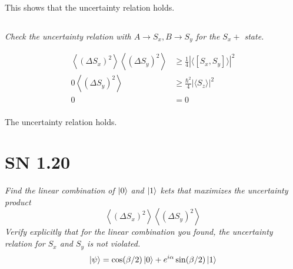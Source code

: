 \documentclass{article}
\begin{document}
This shows that the uncertainty relation holds. 

\subsection{}
\textit{Check the uncertainty relation with $A \rightarrow S_{x}, B \rightarrow S_{y}$ for the $S_{x}+$ state.}

\begin{align*}
\left\langle(\Delta  S_{x})^{2}\right\rangle\left\langle(\Delta  S_{y})^{2}\right\rangle &\geq \frac{1}{4}|\langle[ S_{x},  S_{y}]\rangle|^{2}\\
0 \left\langle(\Delta  S_{y})^{2}\right\rangle &\geq \frac{\hbar^2}{4} |\langle S_{z}\rangle|^{2}\\
0 &= 0 \\
\end{align*}

The uncertainty relation holds. 



\newpage
\section{SN 1.20}
\textit{Find the linear combination of $\ket{0}$ and $\ket{1}$ kets that maximizes the uncertainty product
$$
\left\langle\left(\Delta S_{x}\right)^{2}\right\rangle\left\langle\left(\Delta S_{y}\right)^{2}\right\rangle
$$
Verify explicitly that for the linear combination you found, the uncertainty relation for $S_{x}$ and $S_{y}$ is not violated.}
$$\ket{\psi} =\cos (\beta / 2) \ket{0} + e^{i \alpha} \sin (\beta / 2) \ket{1}$$
\end{document}

